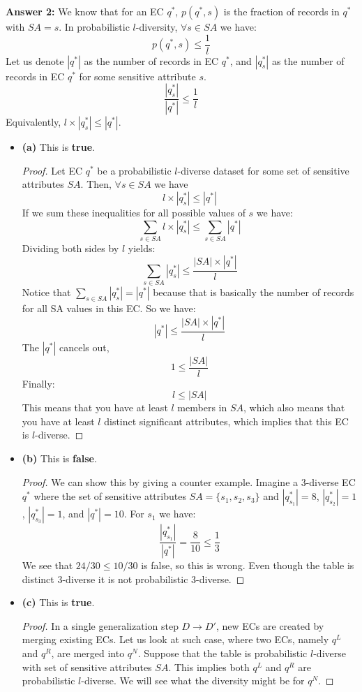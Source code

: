\documentclass[12pt,reqno]{amsart}
\begin{document}
\newpage
\textbf{Answer 2:} We know that for an EC $q^*$, $p(q^*, s)$ is the fraction of records in $q^*$ with $SA=s$. In probabilistic $l$-diversity, $\forall s \in SA$ we have:
$$
p(q^*, s) \leq \frac{1}{l}
$$ 
Let us denote $|q^*|$ as the number of records in EC $q^*$, and $|q_s^*|$ as the number of records in EC $q^*$ for some sensitive attribute $s$.
$$
\frac{|q_s^*|}{|q^*|}\leq \frac{1}{l}
$$ 
Equivalently, $ l\times|q_s^*|\leq |q^*|$.
\begin{itemize}[label=]
	\item \textbf{(a)} This is \textbf{true}.
	\begin{proof} Let EC $q^*$ be a probabilistic $l$-diverse dataset for some set of sensitive attributes $SA$. Then, $\forall s \in SA$ we have
	$$
	l\times|q_s^*|\leq |q^*|
	$$
	If we sum these inequalities for all possible values of $s$ we have:
	$$
	\sum_{s \in SA}l\times|q_s^*| \leq \sum_{s \in SA}|q^*|
	$$
	Dividing both sides by $l$ yields:
	$$
	\sum_{s \in SA}|q_s^*| \leq \frac{|SA|\times|q^*|}{l}
	$$
	Notice that $\sum_{s \in SA}|q_s^*| = |q^*|$ because that is basically the number of records for all SA values in this EC. So we have:
$$
	|q^*| \leq \frac{|SA|\times|q^*|}{l}
	$$
	The $|q^*|$ cancels out,
	$$
	1\leq \frac{|SA| }{l}
	$$
	Finally:
	$$
	l \leq |SA|
	$$
	This means that you have at least $l$ members in $SA$, which also means that you have at least $l$ distinct significant attributes, which implies that this EC is $l$-diverse.
	\end{proof}
 	\item \textbf{(b)} This is \textbf{false}.
 	\begin{proof} We can show this by giving a counter example. Imagine a 3-diverse EC $q^*$  where the set of sensitive attributes $SA = \{s_1, s_2, s_3\}$ and $|q_{s_1}^*|=8$, $|q_{s_2}^*|=1$, $|q_{s_3}^*|=1$, and $|q^*|=10$. For $s_1$ we have:
 $$
\frac{|q_{s_1}^*|}{|q^*|} = \frac{8}{10}\leq \frac{1}{3}
$$
We see that $24/30 \leq 10/30$ is false, so this is wrong. Even though the table is distinct 3-diverse it is not probabilistic 3-diverse.
\end{proof}
\item \textbf{(c)} This is \textbf{true}. 
\begin{proof}
In a single generalization step $D \rightarrow D'$, new ECs are created by merging existing ECs. Let us look at such case, where two ECs, namely $q^L$ and $q^R$, are merged into $q^N$. Suppose that the table is probabilistic $l$-diverse with set of sensitive attributes $SA$. This implies both $q^L$ and $q^R$ are probabilistic $l$-diverse. We will see what the diversity might be for $q^N$. 


\end{proof}
\end{itemize}
\end{document}
